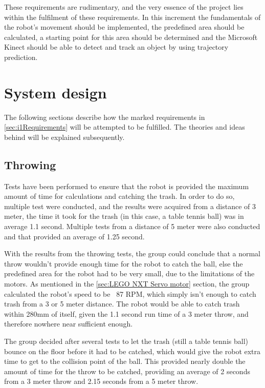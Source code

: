 These requirements are rudimentary, and the very essence of the project lies within the fulfilment of these requirements. In this increment the fundamentals of the robot’s movement should be implemented, the predefined area should be calculated, a starting point for this area should be determined and the Microsoft Kinect should be able to detect and track an object by using trajectory prediction.

\section{System design}
\label{sec:i1System Design}
The following sections describe how the marked requirements in \ref{sec:i1Requirements} will be attempted to be fulfilled. The theories and ideas behind will be explained subsequently.

\subsection{Throwing}
\label{sec:i1Throwing}
Tests have been performed to ensure that the robot is provided the maximum amount of time for calculations and catching the trash. In order to do so, multiple test were conducted, and the results were acquired from a distance of 3 meter, the time it took for the trash (in this case, a table tennis ball) was in average 1.1 second. Multiple tests from a distance of 5 meter were also conducted and that provided an average of 1.25 second. 

With the results from the throwing tests, the group could conclude that a normal throw wouldn't provide enough time for the robot to catch the ball, else the predefined area for the robot had to be very small, due to the limitations of the motors. As mentioned in the \ref{sec:LEGO NXT Servo motor} section, the group calculated the robot's speed to be ~87 RPM, which simply isn't enough to catch trash from a 3 or 5 meter distance. The robot would be able to catch trash within 280mm of itself, given the 1.1 second run time of a 3 meter throw, and therefore nowhere near sufficient enough. 

The group decided after several tests to let the trash (still a table tennis ball) bounce on the floor before it had to be catched, which would give the robot extra time to get to the collision point of the ball. This provided nearly double the amount of time for the throw to be catched, providing an average of 2 seconds from a 3 meter throw and 2.15 seconds from a 5 meter throw.

